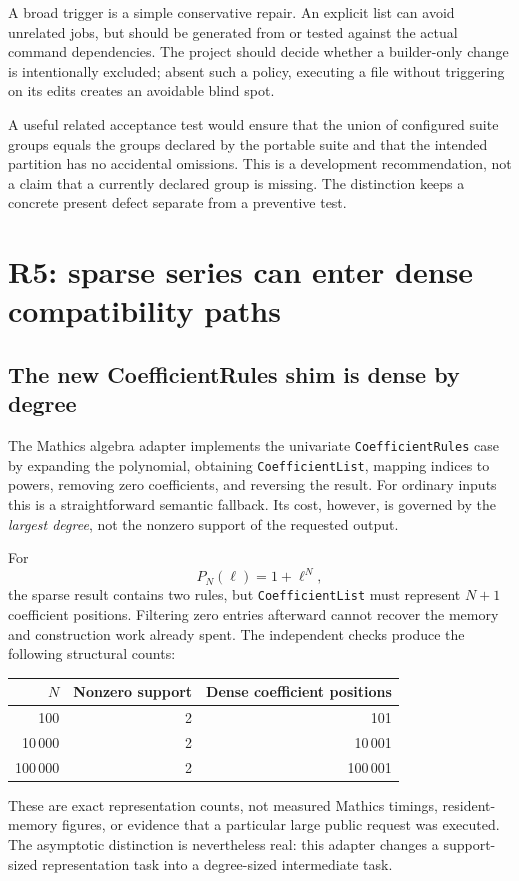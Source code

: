 \documentclass[11pt,a4paper]{article}
\newcommand{\code}[1]{\texttt{#1}}
\begin{document}
A broad  trigger is a simple conservative repair. An explicit list can avoid unrelated jobs, but should be generated from or tested against the actual command dependencies. The project should decide whether a builder-only change is intentionally excluded; absent such a policy, executing a file without triggering on its edits creates an avoidable blind spot.

A useful related acceptance test would ensure that the union of configured suite groups equals the groups declared by the portable suite and that the intended partition has no accidental omissions. This is a development recommendation, not a claim that a currently declared group is missing. The distinction keeps a concrete present defect separate from a preventive test.

\section{R5: sparse series can enter dense compatibility paths}
\label{sec:performance}
\subsection{The new CoefficientRules shim is dense by degree}
The Mathics algebra adapter implements the univariate \code{CoefficientRules} case by expanding the polynomial, obtaining \code{CoefficientList}, mapping indices to powers, removing zero coefficients, and reversing the result. For ordinary inputs this is a straightforward semantic fallback. Its cost, however, is governed by the \emph{largest degree}, not the nonzero support of the requested output.\cite{algebra}

For
\begin{equation}
 P_N(\ell)=1+\ell^N,
\end{equation}
the sparse result contains two rules, but \code{CoefficientList} must represent $N+1$ coefficient positions. Filtering zero entries afterward cannot recover the memory and construction work already spent. The independent checks produce the following structural counts:
\begin{center}
\begin{tabular}{@{}rrr@{}}
\toprule
$N$ & Nonzero support & Dense coefficient positions\\
\midrule
100 & 2 & 101\\
10\,000 & 2 & 10\,001\\
100\,000 & 2 & 100\,001\\
\bottomrule
\end{tabular}
\end{center}
These are exact representation counts, not measured Mathics timings, resident-memory figures, or evidence that a particular large public request was executed. The asymptotic distinction is nevertheless real: this adapter changes a support-sized representation task into a degree-sized intermediate task.
\end{document}
